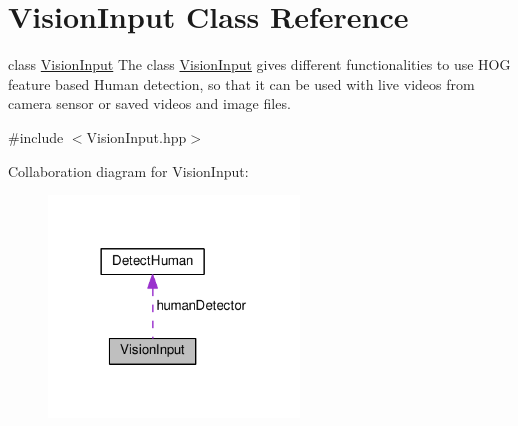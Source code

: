 \hypertarget{classVisionInput}{}\section{Vision\+Input Class Reference}
\label{classVisionInput}


class \hyperlink{classVisionInput}{Vision\+Input} The class \hyperlink{classVisionInput}{Vision\+Input} gives different functionalities to use H\+OG feature based Human detection, so that it can be used with live videos from camera sensor or saved videos and image files.  




{\ttfamily \#include $<$Vision\+Input.\+hpp$>$}



Collaboration diagram for Vision\+Input\+:
\nopagebreak
\begin{figure}[H]
\begin{center}
\leavevmode
\includegraphics[width=189pt]{classVisionInput__coll__graph}
\end{center}
\end{figure}
